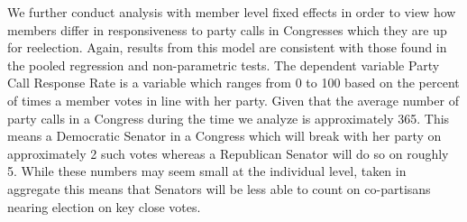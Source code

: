 \documentclass[12pt]{article}
\begin{document}
We further conduct analysis with member level fixed effects in order to view how members differ in responsiveness to party calls in Congresses which they are up for reelection. Again, results from this model are consistent with those found in the pooled regression and non-parametric tests. The dependent variable Party Call Response Rate is a variable which ranges from 0 to 100 based on the percent of times a member votes in line with her party. Given that the average number of party calls in a Congress during the time we analyze is approximately 365. This means a Democratic Senator in a Congress which will break with her party on approximately 2 such votes whereas a Republican Senator will do so on roughly 5. While these numbers may seem small at the individual level, taken in aggregate this means that Senators will be less able to count on co-partisans nearing election on key close votes.
\end{document}
